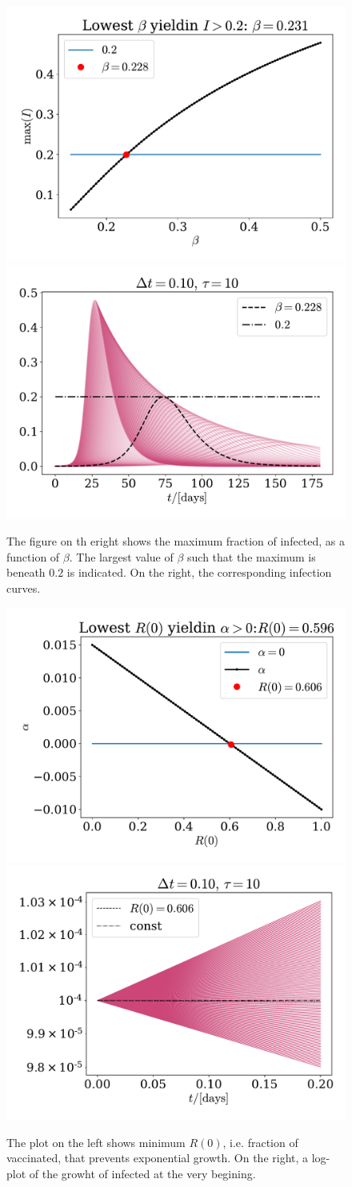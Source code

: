 \documentclass{article}
\begin{document}
    \begin{figure}[H]
        \centering
        \includegraphics[width=.49\textwidth]{../plots/2A/flatten.pdf}
        \includegraphics[width=.49\textwidth]{../plots/2A/flattenIs.pdf}
        \caption{The figure on th eright shows the maximum fraction of infected, as a function of $\beta$. 
        The largest value of $\beta$ such that the maximum is beneath $0.2$ is indicated. 
        On the right, the corresponding infection curves.}
        \label{flattening}
    \end{figure}

    \begin{figure}[H]
        \centering
        \includegraphics[width=.49\textwidth]{../plots/2A/vax.pdf}
        \includegraphics[width=.49\textwidth]{../plots/2A/vax_R.pdf}
        \caption{The plot on the left shows minimum $R(0)$, i.e. fraction of vaccinated, that prevents exponential growth.
        On the right, a log-plot of the growht of infected at the very begining.}
        \label{vax}
    \end{figure}
\end{document}
